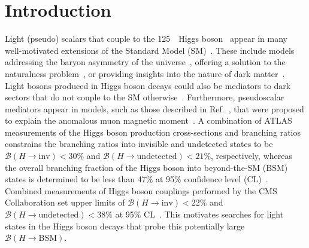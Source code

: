 \documentclass[cernpreprint, backref=false, texlive=2020, UKenglish, dvipsnames, block=none, texmf]{atlasdoc}
\author{The ATLAS Collaboration}
\begin{document}
 
\maketitle
 
 
 
\section{Introduction}
 
 
 
 
Light (pseudo) scalars that couple to the 125~\GeV\ Higgs boson~\cite{HIGG-2012-27,CMS-HIG-12-028} appear in many well-motivated extensions of the Standard Model (SM)~\cite{Dobrescu:2000yn,Ellwanger:2003jt,Dermisek:2005ar,Chang:2008cw,Morrissey:2008gm,Belanger:2013kya}.
These include models addressing the baryon asymmetry of the universe~\cite{Profumo:2007wc,Blinov:2015sna}, offering a solution to the naturalness problem~\cite{Craig:2015pha,Curtin:2015fna}, or providing insights into the nature of dark matter~\cite{Silveira:1985rk,Pospelov:2007mp,Draper:2010ew,Ipek:2014gua,Martin:2014sxa,Boehm:2014hva,GammaRayCascade}. Light bosons produced in Higgs boson decays could also be mediators to dark sectors that do not couple to the SM otherwise~\cite{Curtin:2013fra,TaniaTim1,TaniaTim2,TaniaTim3,ALPS}. Furthermore, pseudoscalar mediators appear in models, such as those described in Ref.~\cite{Liu_2019}, that were proposed to explain the anomalous muon magnetic moment~\cite{mug2_Fermi}.
A combination of ATLAS measurements of the Higgs boson production cross-sections and branching ratios
constrains the branching ratios  into invisible and undetected states to be  $\mathcal{B}(H\rightarrow\text{inv})<30\%$ and $\mathcal{B}(H\rightarrow\text{undetected})<21\%$, respectively,
whereas the overall branching fraction of the Higgs boson into beyond-the-SM (BSM) states is determined to be less than 47\% at 95\% confidence level (CL)~\cite{HIGG-2018-57}.
Combined measurements of Higgs boson couplings performed by the  CMS Collaboration set upper limits  of $\mathcal{B}(H\rightarrow\text{inv})<22\%$ and $\mathcal{B}(H\rightarrow\text{undetected})<38\%$ at 95\% CL~\cite{CMS-HIG-17-031}.
This motivates searches for light states in the Higgs boson decays that probe this potentially large $\mathcal{B}(H\rightarrow\text{BSM})$.
 
 
 
\end{document}
